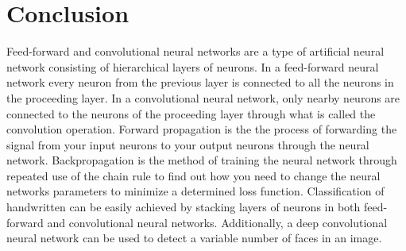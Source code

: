 \documentclass[a4paper, twoside]{article}
\begin{document}
\section{Conclusion} 
Feed-forward and convolutional neural networks are a type of artificial neural network consisting of hierarchical layers of neurons. In a feed-forward neural network every neuron from the previous layer is connected to all the neurons in the proceeding layer. In a convolutional neural network, only nearby neurons are connected to the neurons of the proceeding layer through what is called the convolution operation. Forward propagation is the the process of forwarding the signal from your input neurons to your output neurons through the neural network. Backpropagation is the method of training the neural network through repeated use of the chain rule to find out how you need to change the neural networks parameters to minimize a determined loss function. Classification of handwritten can be easily achieved by stacking layers of neurons in both feed-forward and convolutional neural networks. Additionally, a deep convolutional neural network can be used to detect a variable number of faces in an image.
\end{document}
